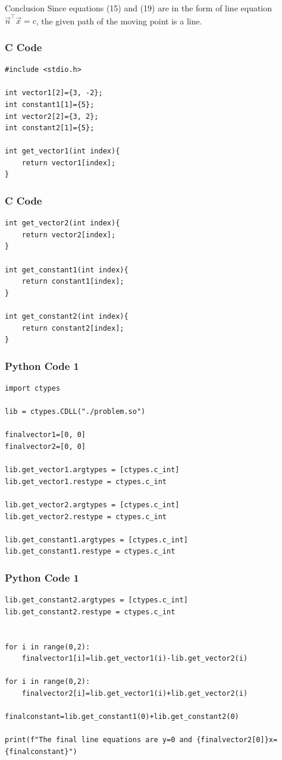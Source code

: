 \documentclass{beamer}
\begin{document}
\begin{frame}{Conclusion}
Since equations (15) and (19) are in the form of line equation $\vec{n}^\top\vec{x}=c$, the given path of the moving point is a line.
\end{frame}


\begin{frame}[fragile]
    \frametitle{C Code}
    \begin{lstlisting}
#include <stdio.h>

int vector1[2]={3, -2};
int constant1[1]={5};
int vector2[2]={3, 2};
int constant2[1]={5};

int get_vector1(int index){
    return vector1[index];
}
    \end{lstlisting}
\end{frame}

\begin{frame}[fragile]
    \frametitle{C Code}
    \begin{lstlisting}
int get_vector2(int index){
    return vector2[index];
}

int get_constant1(int index){
    return constant1[index];
}

int get_constant2(int index){
    return constant2[index];
}
    \end{lstlisting}
\end{frame}

\begin{frame}[fragile]
    \frametitle{Python Code 1}
    \begin{lstlisting}
import ctypes

lib = ctypes.CDLL("./problem.so")

finalvector1=[0, 0]
finalvector2=[0, 0]

lib.get_vector1.argtypes = [ctypes.c_int]
lib.get_vector1.restype = ctypes.c_int

lib.get_vector2.argtypes = [ctypes.c_int]
lib.get_vector2.restype = ctypes.c_int

lib.get_constant1.argtypes = [ctypes.c_int]
lib.get_constant1.restype = ctypes.c_int
    \end{lstlisting}
\end{frame}

\begin{frame}[fragile]
    \frametitle{Python Code 1}
    \begin{lstlisting}
lib.get_constant2.argtypes = [ctypes.c_int]
lib.get_constant2.restype = ctypes.c_int


for i in range(0,2):
    finalvector1[i]=lib.get_vector1(i)-lib.get_vector2(i)

for i in range(0,2):
    finalvector2[i]=lib.get_vector1(i)+lib.get_vector2(i)

finalconstant=lib.get_constant1(0)+lib.get_constant2(0)

print(f"The final line equations are y=0 and {finalvector2[0]}x={finalconstant}")
    \end{lstlisting}
\end{frame}
\end{document}
